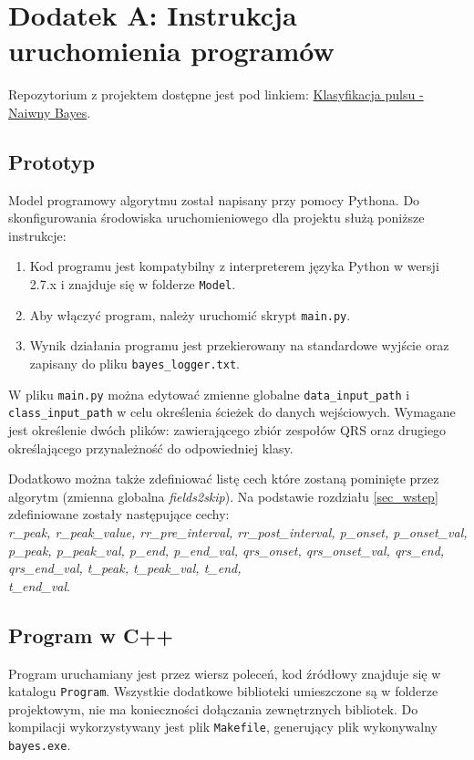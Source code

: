 \section{Dodatek A: Instrukcja uruchomienia programów}
\label{dodatekA}

Repozytorium z projektem dostępne jest pod linkiem: \href{https://github.com/kamilfocus/ESDMiT-Naive-Bayes}{Klasyfikacja pulsu - Naiwny Bayes}. 

\subsection{Prototyp}
Model programowy algorytmu został napisany przy pomocy Pythona. Do skonfigurowania środowiska uruchomieniowego dla projektu służą poniższe instrukcje:

\begin{enumerate}
	\item Kod programu jest kompatybilny z interpreterem języka Python w wersji 2.7.x i znajduje się w folderze \texttt{Model}.
	\item Aby włączyć program, należy uruchomić skrypt \texttt{main.py}.
	\item Wynik działania programu jest przekierowany na standardowe wyjście oraz zapisany do pliku \texttt{bayes\_logger.txt}.
\end{enumerate}

W pliku \texttt{main.py} można edytować zmienne globalne \texttt{data\_input\_path} i \texttt{class\_input\_path} w celu określenia ścieżek do danych wejściowych. Wymagane jest określenie dwóch plików: zawierającego zbiór zespołów QRS oraz drugiego określającego przynależność do odpowiedniej klasy.

Dodatkowo można także zdefiniować listę cech które zostaną pominięte przez algorytm (zmienna globalna \textit{fields2skip}). Na podstawie rozdziału \ref{sec_wstep} zdefiniowane zostały następujące cechy:\\
\textit{r\_peak, r\_peak\_value, rr\_pre\_interval, rr\_post\_interval, 
p\_onset, p\_onset\_val, p\_peak, p\_peak\_val, p\_end, p\_end\_val, 
qrs\_onset, qrs\_onset\_val, qrs\_end, qrs\_end\_val, t\_peak, t\_peak\_val, 
t\_end, \\t\_end\_val}.

\subsection{Program w C++}

Program uruchamiany jest przez wiersz poleceń, kod źródłowy znajduje się w katalogu \texttt{Program}. Wszystkie dodatkowe biblioteki umieszczone są w folderze projektowym, nie ma konieczności dołączania zewnętrznych bibliotek. Do kompilacji wykorzystywany jest plik \texttt{Makefile}, generujący plik wykonywalny \texttt{bayes.exe}.

